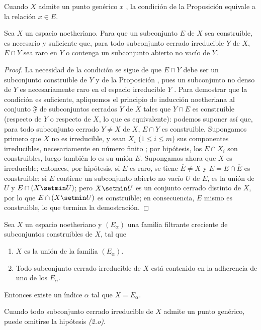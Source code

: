 \documentclass[oneside]{amsart}
\renewcommand{\leq}{\leqslant}
\let\EGAOriginalLabel\label
\renewcommand{\label}[1]{\phantomsection\EGAOriginalLabel{#1}}
\begin{document}
Cuando $X$ admite un punto genérico $x$ , la condición de la Proposición  equivale a la relación $x\in E$.

\begin{proposition}[9.2.3]
\label{0.9.2.3}
Sea $X$ un espacio noetheriano.
Para que un subconjunto $E$ de $X$ sea construible, es necesario y suficiente que, para todo subconjunto cerrado irreducible $Y$ de $X$, $E\cap Y$ sea raro en $Y$ o contenga un subconjunto abierto no vacío de $Y$.
\end{proposition}

\begin{proof}
La necesidad de la condición se sigue de que $E\cap Y$ debe ser un subconjunto construible de $Y$ y de la Proposición , pues un subconjunto no denso de $Y$ es necesariamente raro en el espacio irreducible $Y$ .
Para demostrar que la condición es suficiente, apliquemos el principio de inducción noetheriana  al conjunto $\mathfrak{F}$ de subconjuntos cerrados $Y$ de $X$ tales que $Y\cap E$ es construible (respecto de $Y$ o respecto de $X$, lo que es equivalente): podemos suponer así que, para todo subconjunto cerrado $Y\neq X$ de $X$, $E\cap Y$ es construible.
Supongamos primero que $X$ no es irreducible, y sean $X_i$ ($1\leq i\leq m$) sus componentes irreducibles, necesariamente en número finito ; por hipótesis, los $E\cap X_i$ son construibles, luego también lo es su unión $E$.
Supongamos ahora que $X$ es irreducible; entonces, por hipótesis, si $E$ es raro, se tiene $\overline{E}\neq X$ y $E=E\cap\overline{E}$ es construible; si $E$ contiene un subconjunto abierto no vacío $U$ de $E$, es la unión de $U$ y $E\cap(X\setmin U)$; pero $X\setmin U$ es un conjunto cerrado distinto de $X$, por lo que $E\cap(X\setmin U)$ es construible; en consecuencia, $E$ mismo es construible, lo que termina la demostración.
\end{proof}

\begin{corollary}[9.2.4]
\label{0.9.2.4}
Sea $X$ un espacio noetheriano y $(E_\alpha)$ una familia filtrante creciente de subconjuntos construibles de $X$, tal que
\begin{enumerate}
  \item[\emph{(1.o)}] $X$ es la unión de la familia $(E_\alpha)$.
  \item[\emph{(2.o)}] Todo subconjunto cerrado irreducible de $X$ está contenido en la adherencia de uno de los $E_\alpha$.
\end{enumerate}

Entonces existe un índice $\alpha$ tal que $X=E_\alpha$.

Cuando todo subconjunto cerrado irreducible de $X$ admite un punto genérico, puede omitirse la hipótesis \emph{(2.o)}.
\end{corollary}
\end{document}
